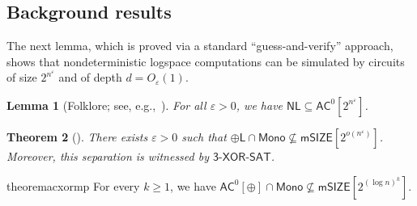 \documentclass[10pt,a4paper]{article}
\newtheorem{theorem}{Theorem}[section]
\newtheorem{lemma}[theorem]{Lemma}
\newcommand{\eps}{\varepsilon}
\newcommand{\complexityfont}[1]{\mathsf{#1}}
\newcommand{\monclass}[1]{\mathsf{m}#1}
\newcommand\NL           {\complexityfont{NL}}
\def\AC           {\complexityfont{AC}}
\def\pL           {\oplus\complexityfont{L}}
\def\SIZE         {\complexityfont{SIZE}}
\def\mSIZE        {\monclass{\SIZE}}
\newcommand{\semMon}[1]{#1 \cap \monfns}
\newcommand{\monfns}{\mathsf{Mono}}
\newcommand{\txorsat}{\mathsf{3\mbox{-}XOR\mbox{-}SAT}}
\def\sseq{\subseteq}
\begin{document}
\subsection{Background results}


The next lemma, which is proved via a standard ``guess-and-verify''
approach, shows that nondeterministic logspace computations can be
simulated by circuits of size $2^{n^{\varepsilon}}$ and of depth $d =
O_\varepsilon(1)$.

\begin{lemma}[Folklore; see, e.g.,~{\cite[Lemma 8.1]{AHMPS08}}]
    \label{lemma:ac0_nc1_sim}
    For all $\eps > 0$, we have
    $\NL \sseq \AC^0[2^{n^\eps}]$.
\end{lemma}







\begin{theorem}[\cite{gkrs19}]
    \label{thm:xor-sat}
    There exists $\eps > 0$ 
    such that 
    $\semMon{\pL} \not\sseq \mSIZE[2^{o(n^{\eps})}]$.
    Moreover, 
    this separation is witnessed by $\txorsat$.
\end{theorem}

\begin{restatable}{theorem}{acxormp}
    \label{thm:ac02-mp-intro}
    For every $k \geq 1$,
    we have
$\semMon{\AC^0[\oplus]} \not\sseq \mSIZE[2^{(\log n)^k}]$.
\end{restatable}
\end{document}
